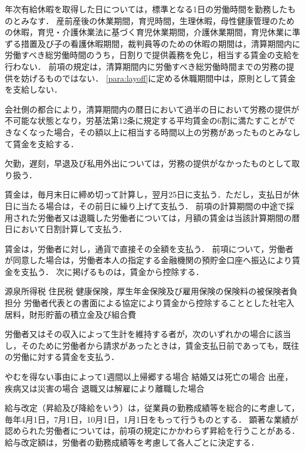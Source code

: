 \documentclass[11pt,a4paper]{jsarticle}
\begin{document}
年次有給休暇を取得した日については，標準となる1日の労働時間を勤務したものとみなす．
\term
産前産後の休業期間，育児時間，生理休暇，母性健康管理のための休暇，育児・介護休業法に基づく育児休業期間，介護休業期間，育児休業に準ずる措置及び子の看護休暇期間，裁判員等のための休暇の期間は，清算期間内に労働すべき総労働時間のうち，日割りで提供義務を免じ，相当する賃金の支給を行わない． 
\term
前項の規定は，清算期間内に労働すべき総労働時間までの労務の提供を妨げるものではない．
\term
\ref{para:layoff}に定める休職期間中は，原則として賃金を支給しない．

会社側の都合により，清算期間内の暦日において過半の日において労務の提供が不可能な状態となり，労基法第12条に規定する平均賃金の6割に満たすことができなくなった場合，その額以上に相当する時間以上の労務があったものとみなして賃金を支給する． 

欠勤，遅刻，早退及び私用外出については，労務の提供がなかったものとして取り扱う．

賃金は，毎月末日に締め切って計算し，翌月25日に支払う．ただし，支払日が休日に当たる場合は，その前日に繰り上げて支払う．
\term
前項の計算期間の中途で採用された労働者又は退職した労働者については，月額の賃金は当該計算期間の暦日において日割計算して支払う．

賃金は，労働者に対し，通貨で直接その全額を支払う．
\term
前項について，労働者が同意した場合は，労働者本人の指定する金融機関の預貯金口座へ振込により賃金を支払う．
\term
次に掲げるものは，賃金から控除する．
\begin{enumerate}
	\itm 源泉所得税
	\itm 住民税
	\itm 健康保険，厚生年金保険及び雇用保険の保険料の被保険者負担分
	\itm 労働者代表との書面による協定により賃金から控除することとした社宅入居料，財形貯蓄の積立金及び組合費
\end{enumerate}

労働者又はその収入によって生計を維持する者が，次のいずれかの場合に該当し，そのために労働者から請求があったときは，賃金支払日前であっても，既往の労働に対する賃金を支払う．
\begin{enumerate}
	\itm やむを得ない事由によって1週間以上帰郷する場合
	\itm 結婚又は死亡の場合
	\itm 出産，疾病又は災害の場合
	\itm 退職又は解雇により離職した場合
\end{enumerate}

給与改定（昇給及び降給をいう）は，従業員の勤務成績等を総合的に考慮して，毎年4月1日，7月1日，10月1日，1月1日をもって行うものとする．
\term
顕著な業績が認められた労働者については，前項の規定にかかわらず昇給を行うことがある．
\term
給与改定額は，労働者の勤務成績等を考慮して各人ごとに決定する．
\end{document}

